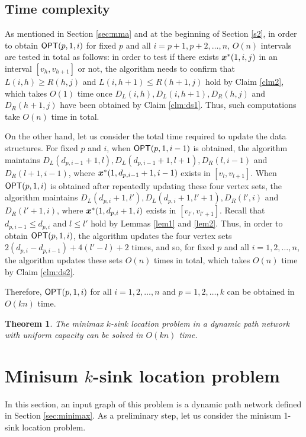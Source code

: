 \documentclass[a4paper]{llncs}
\newcommand{\bm}[1]{\mbox{\boldmath{$#1$}}}
\newtheorem{thm}{Theorem}
\begin{document}
\subsection{Time complexity}


As mentioned in Section \ref{sec:mma} and at the beginning of Section \ref{s2}, in order to obtain ${\sf OPT}(p, 1, i)$ for fixed $p$ and all $i=p+1, p+2, \ldots, n$, 
$O(n)$ intervals are tested in total as follows:
in order to test if there exists ${\bm x}^*(1, i, j)$ in an interval $[v_h, v_{h+1}]$ or not, 
the algorithm needs to confirm that $L(i, h) \ge R(h, j)$ and $L(i, h+1) \le R(h+1, j)$ hold by Claim \ref{clm2}, 
which takes $O(1)$ time once $D_L(i, h), D_L(i, h+1), D_R(h, j)$ and $D_R(h+1, j)$ have been obtained by Claim \ref{clm:ds1}.
Thus, such computations take $O(n)$ time in total.

On the other hand, let us consider the total time required to update the data structures.
For fixed $p$ and $i$, when ${\sf OPT}(p, 1, i-1)$ is obtained, the algorithm maintains $D_L(d_{p, i-1}+1, l), D_L(d_{p, i-1}+1, l+1), D_R(l, i-1)$ and $D_R(l+1, i-1)$,
where ${\bm x}^*(1, d_{p, i-1}+1, i-1)$ exists in $[v_l, v_{l+1}]$.
When ${\sf OPT}(p, 1, i)$ is obtained after repeatedly updating these four vertex sets, 
the algorithm maintains $D_L(d_{p, i}+1, l'), D_L(d_{p, i}+1, l'+1), D_R(l', i)$ and $D_R(l'+1, i)$,
where ${\bm x}^*(1, d_{p, i}+1, i)$ exists in $[v_{l'}, v_{l'+1}]$.
Recall that $d_{p, i-1} \le d_{p, i}$ and $l \le l'$ hold by Lemmas \ref{lem1} and \ref{lem2}.
Thus, in order to obtain ${\sf OPT}(p, 1, i)$, the algorithm updates the four vertex sets $2(d_{p, i}-d_{p, i-1}) + 4(l'-l) + 2$ times,
and so, for fixed $p$ and all $i=1, 2, \ldots, n$, the algorithm updates these sets $O(n)$ times in total,
which takes $O(n)$ time by Claim \ref{clm:ds2}.


Therefore, ${\sf OPT}(p, 1, i)$ for all $i=1, 2, \ldots, n$ and $p=1, 2, \ldots, k$ can be obtained in $O(kn)$ time.
\begin{thm}
The minimax $k$-sink location problem in a dynamic path network with uniform capacity can be solved in $O(kn)$ time.
\label{thm:mm1}
\end{thm}














\section{Minisum $k$-sink location problem}
\label{sec:minisum}
In this section, an input graph of this problem is a dynamic path network defined in Section \ref{sec:minimax}.
As a preliminary step, let us consider the minisum 1-sink location problem.
\end{document}
